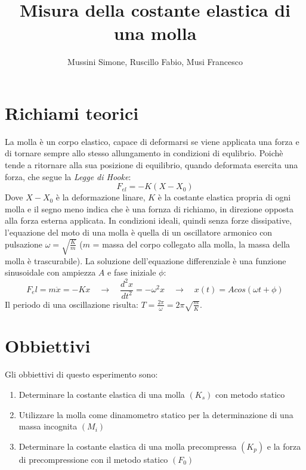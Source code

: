 \documentclass[12pt, a4paper]{article}
\title{\textbf{Misura della costante elastica di una molla}}
\date{}
\author{\begin{small}Mussini Simone, Ruscillo Fabio, Musi Francesco\end{small}}
\begin{document}
\maketitle



\section{Richiami teorici}
La molla è un corpo elastico, capace di deformarsi se viene applicata una forza e di tornare sempre allo stesso allungamento in condizioni di equlibrio. 
Poichè tende a ritornare alla sua posizione di equilibrio, quando deformata esercita una forza, che segue la \textit{Legge di Hooke}: 
\begin{equation}
    F_{el} = -K(X-X_0)
\end{equation}
Dove $X-X_0$ è la deformazione linare, $K$ è la costante elastica propria di ogni molla e il segno meno 
indica che è una fornza di richiamo, in direzione opposta alla forza esterna applicata.
In condizioni ideali, quindi senza forze dissipative, l'equazione del moto di una molla è quella di 
un oscillatore armonico con pulsazione $\omega = \sqrt{\frac{K}{m}}$ ($m$ = massa del corpo collegato alla molla, la massa della molla è trascurabile). La soluzione dell'equazione differenziale è una funzione sinusoidale con ampiezza $A$ e fase iniziale $\phi$:
\begin{equation}
    F_el = m\ddot{x} = -Kx   \quad\xrightarrow{}\quad   \frac{d^2x}{dt^2} = -\omega^2x  \quad\xrightarrow{}\quad   x(t) = A cos(\omega t + \phi)
\end{equation}
Il periodo di una oscillazione risulta: $T = \frac{2\pi}{\omega} = 2\pi\sqrt{\frac{m}{K}}$.




\section{Obbiettivi}
Gli obbiettivi di questo esperimento sono: 
\begin{enumerate}
    \setlength\itemsep{0cm}
    \item Determinare la costante elastica di una molla $(K_s)$ con metodo statico
    \item Utilizzare la molla come dinamometro statico per la determinazione di una massa incognita $(M_i)$
    \item Determinare la costante elastica di una molla precompressa $(K_p)$ e la forza di precompressione con il metodo statico $(F_0)$
\end{enumerate}
\end{document}
